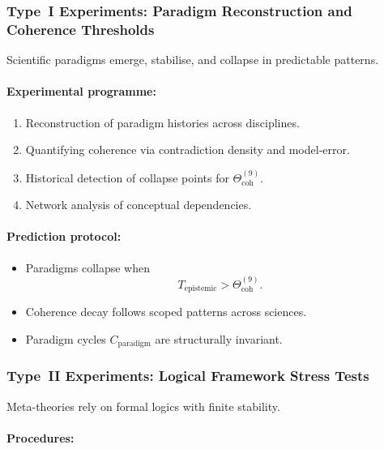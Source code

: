 \subsubsection{Type~I Experiments: Paradigm Reconstruction and Coherence Thresholds}

Scientific paradigms emerge, stabilise, and collapse in
predictable patterns.

\paragraph{Experimental programme:}

\begin{enumerate}
    \item Reconstruction of paradigm histories across disciplines.
    \item Quantifying coherence via contradiction density and model-error.
    \item Historical detection of collapse points for
          $\Theta_{\mathrm{coh}}^{(9)}$.
    \item Network analysis of conceptual dependencies.
\end{enumerate}

\paragraph{Prediction protocol:}

\begin{itemize}
    \item Paradigms collapse when
          \[
              T_{\mathrm{epistemic}} > \Theta_{\mathrm{coh}}^{(9)}.
          \]
    \item Coherence decay follows scoped patterns across sciences.
    \item Paradigm cycles $C_{\mathrm{paradigm}}$ are structurally invariant.
\end{itemize}



\subsubsection{Type~II Experiments: Logical Framework Stress Tests}

Meta-theories rely on formal logics with finite stability.

\paragraph{Procedures:}

